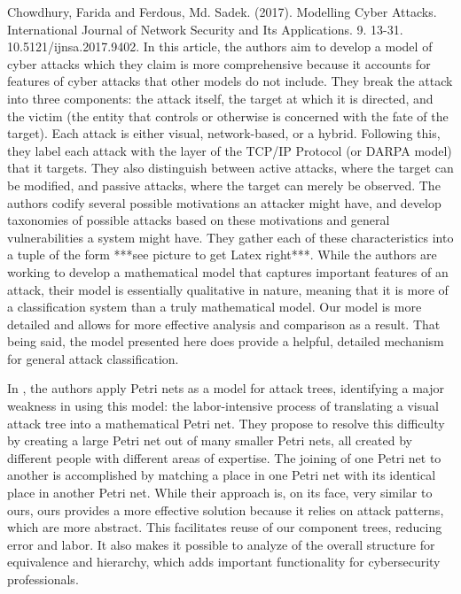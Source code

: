 \par {} Chowdhury, Farida and Ferdous, Md. Sadek. (2017). Modelling Cyber Attacks. International Journal of Network Security and Its Applications. 9. 13-31. 10.5121/ijnsa.2017.9402.  In this article, the authors aim to develop a model of cyber attacks which they claim is more comprehensive because it accounts for features of cyber attacks that other models do not include. They break the attack into three components: the attack itself, the target at which it is directed, and the victim (the entity that controls or otherwise is concerned with the fate of the target). Each attack is either visual, network-based, or a hybrid. Following this, they label each attack with the layer of the TCP/IP Protocol (or DARPA model) that it targets. They also distinguish between active attacks, where the target can be modified, and passive attacks, where the target can merely be observed. The authors codify several possible motivations an attacker might have, and develop taxonomies of possible attacks based on these motivations and general vulnerabilities a system might have. They gather each of these characteristics into a tuple of the form ***see picture to get Latex right***. While the authors are working to develop a mathematical model that captures important features of an attack, their model is essentially qualitative in nature, meaning that it is more of a classification system than a truly mathematical model. Our model is more detailed and allows for more effective analysis and comparison as a result. That being said, the model presented here does provide a helpful, detailed mechanism for general attack classification. 
\par In \cite{city8206,}, the authors apply Petri nets as a model for attack trees, identifying a major weakness in using this model: the labor-intensive process of translating a visual attack tree into a mathematical Petri net. They propose to resolve this difficulty by creating a large Petri net out of many smaller Petri nets, all created by different people with different areas of expertise. The joining of one Petri net to another is accomplished by matching a place in one Petri net with its identical place in another Petri net. While their approach is, on its face, very similar to ours, ours provides a more effective solution because it relies on attack patterns, which are more abstract. This facilitates reuse of our component trees, reducing error and labor. It also makes it possible to analyze of the overall structure for equivalence and hierarchy, which adds important functionality for cybersecurity professionals.

